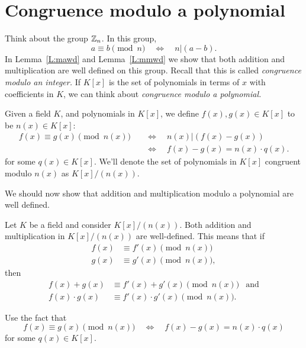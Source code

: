 \documentclass{ximera}
\begin{document}
\section{Congruence modulo a polynomial}

Think about the group $\mathbb Z_n$. In this group,
\[
a\equiv b \pmod{n} \quad\Leftrightarrow \quad n| (a-b).
\]
In Lemma~\ref{L:mawd} and Lemma~\ref{L:mmwd} we show that both
addition and multiplication are well defined on this group. Recall
that this is called \textit{congruence modulo an integer.}  If $K[x]$
is the set of polynomials in terms of $x$ with coefficients in $K$, we
can think about \textit{congruence modulo a polynomial.}


\begin{definition}
  Given a field $K$, and polynomials in $K[x]$, we define
  $f(x),g(x)\in K[x]$ to be 
  $n(x)\in K[x]$:
  \begin{align*}
    f(x) \equiv g(x) \pmod{n(x)}\quad &\Leftrightarrow \quad n(x) | (f(x)-g(x))\\
    &\Leftrightarrow \quad f(x)-g(x) = n(x)\cdot q(x).
  \end{align*}
  for some $q(x)\in K[x]$. We'll denote the set of polynomials in
  $K[x]$ congruent modulo $n(x)$ as $K[x]/(n(x))$.
\end{definition}


We should now show that addition and multiplication modulo a
polynomial are well defined.

\begin{lemma}
  Let $K$ be a field and consider $K[x]/(n(x))$. Both addition and
  multiplication in $K[x]/(n(x))$ are
  well-defined. This means that if
  \begin{align*}
    f(x) &\equiv f'(x) \pmod{n(x)}\\
    g(x) &\equiv g'(x) \pmod{n(x)},
  \end{align*}
  then
  \begin{align*}
    f(x) + g(x) &\equiv f'(x) + g'(x) \pmod{n(x)} & \text{and}\\
    f(x) \cdot g(x) &\equiv f'(x) \cdot g'(x) \pmod{n(x)}. & 
  \end{align*}
  \begin{sketch}
    Use the fact that
    \[
    f(x) \equiv g(x) \pmod{n(x)}\quad \Leftrightarrow \quad f(x)-g(x) = n(x)\cdot q(x)
    \]
    for some $q(x) \in K[x]$.
  \end{sketch}
\end{lemma}
\end{document}
